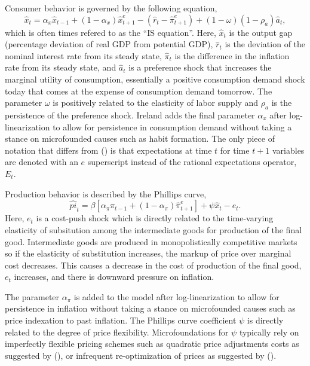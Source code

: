 \documentclass[12pt]{article}
\newcommand{\beq}{\begin{equation}}
\newcommand{\eeq}{\end{equation}}
\newcommand{\citee}[1]{\citename{#1} (\citeyear{#1})}
\begin{document}
Consumer behavior is governed by the following equation,
\beq \label{eq:is} \hat{x}_t = \alpha_x \hat{x}_{t-1} + (1-\alpha_x) \hat{x}_{t+1}^e - (\hat{r}_t - \hat{\pi}_{t+1}^e) + (1-\omega)(1-\rho_a) \hat{a}_t, \eeq
which is often times refered to as the ``IS equation''.  Here, $\hat{x}_t$ is the output gap (percentage deviation of real GDP from potential GDP), $\hat{r}_t$ is the deviation of the nominal interest rate from its steady state, $\hat{\pi}_t$ is the difference in the inflation rate from its steady state, and $\hat{a}_t$ is a preference shock that increases the marginal utility of consumption, essentially a positive consumption demand shock today that comes at the expense of consumption demand tomorrow.  The parameter $\omega$ is positively related to the elasticity of labor supply and $\rho_a$ is the persistence of the preference shock.  Ireland adds the final parameter $\alpha_x$ after log-linearization to allow for persistence in consumption demand without taking a stance on microfounded causes such as habit formation.  The only piece of notation that differs from \citee{ireland_tech_2004} is that expectations at time $t$ for time $t+1$ variables are denoted with an $e$ superscript instead of the rational expectations operator, $E_t$.

Production behavior is described by the Phillips curve,
\beq \label{eq:pc} \hat{pi}_t = \beta \left[ \alpha_{\pi} \hat{\pi}_{t-1} + (1-\alpha_{\pi}) \hat{\pi}_{t+1}^e \right] + \psi \hat{x}_t - e_t. \eeq
Here, $e_t$ is a cost-push shock which is directly related to the time-varying elasticity of subsitution among the intermediate goods for production of the final good.  Intermediate goods are produced in monopolistically competitive markets so if the elasticity of substitution increases, the markup of price over marginal cost decreases.  This causes a decrease in the cost of production of the final good, $e_t$ increases, and there is downward pressure on inflation.

The parameter $\alpha_{\pi}$ is added to the model after log-linearization to allow for persistence in inflation without taking a stance on microfounded causes such as price indexation to past inflation.  The Phillips curve coefficient $\psi$ is directly related to the degree of price flexibility.  Microfoundations for $\psi$ typically rely on imperfectly flexible pricing schemes such as quadratic price adjustments costs as suggested by \citee{rotemberg1982}, or infrequent re-optimization of prices as suggested by \citee{calvo1983}.
\end{document}
